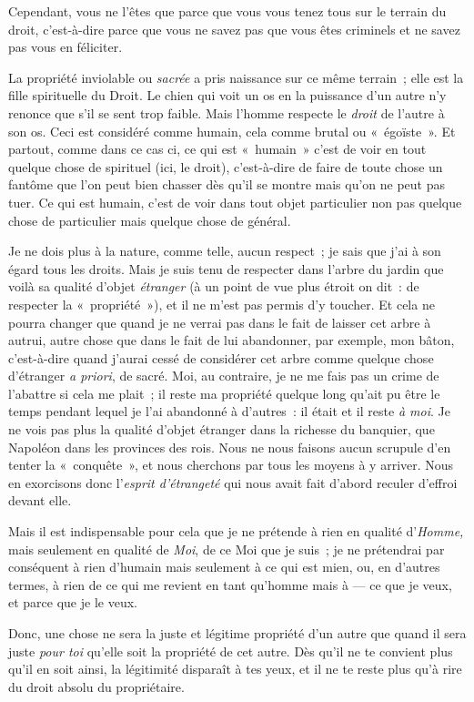 \documentclass[french,twoside]{book} %
\begin{document}
Cependant, vous ne l’êtes que parce que vous vous tenez tous sur le terrain du droit, c’est-à-dire parce que vous ne savez pas que vous êtes criminels et ne savez pas vous en féliciter.\par
La propriété inviolable ou \emph{sacrée} a pris naissance sur ce même terrain ; elle est la fille spirituelle du Droit. Le chien qui voit un os en la puissance d’un autre n’y renonce que s’il se sent trop faible. Mais l’homme respecte le \emph{droit} de l’autre à son os. Ceci est considéré comme humain, cela comme brutal ou « égoïste ». Et partout, comme dans ce cas ci, ce qui est « humain » c’est de voir en tout quelque chose de spirituel (ici, le droit), c’est-à-dire de faire de toute chose un fantôme que l’on peut bien chasser dès qu’il se montre mais qu’on ne peut pas tuer. Ce qui est humain, c’est de voir dans tout objet particulier non pas quelque chose de particulier mais quelque chose de général.\par
Je ne dois plus à la nature, comme telle, aucun respect ; je sais que j’ai à son égard tous les droits. Mais je suis tenu de respecter dans l’arbre du jardin que voilà sa qualité d’objet \emph{étranger} (à un point de vue plus étroit on dit : de respecter la « propriété »), et il ne m’est pas permis d’y toucher. Et cela ne pourra changer que quand je ne verrai pas dans le fait de laisser cet arbre à autrui, autre chose que dans le fait de lui abandonner, par exemple, mon bâton, c’est-à-dire quand j’aurai cessé de considérer cet arbre comme quelque chose d’étranger \emph{a priori},  de sacré. Moi, au contraire, je ne me fais pas un crime de l’abattre si cela me plait ; il reste ma propriété quelque long qu’ait pu être le temps pendant lequel je l’ai abandonné à d’autres : il était et il reste \emph{à moi}. Je ne vois pas plus la qualité d’objet étranger dans la richesse du banquier, que Napoléon dans les provinces des rois. Nous ne nous faisons aucun scrupule d’en tenter la « conquête », et nous cherchons par tous les moyens à y arriver. Nous en exorcisons donc l’\emph{esprit d’étrangeté} qui nous avait fait d’abord reculer d’effroi devant elle.\par
Mais il est indispensable pour cela que je ne prétende à rien en qualité d’\emph{Homme,} mais seulement en qualité de \emph{Moi}, de ce Moi que je suis ; je ne prétendrai par conséquent à rien d’humain mais seulement à ce qui est mien, ou, en d’autres termes, à rien de ce qui me revient en tant qu’homme mais à — ce que je veux, et parce que je le veux.\par
Donc, une chose ne sera la juste et légitime propriété d’un autre que quand il sera juste \emph{pour toi }qu’elle soit la propriété de cet autre. Dès qu’il ne te convient plus qu’il en soit ainsi, la légitimité disparaît à tes yeux, et il ne te reste plus qu’à rire du droit absolu du propriétaire.\par
\end{document}
